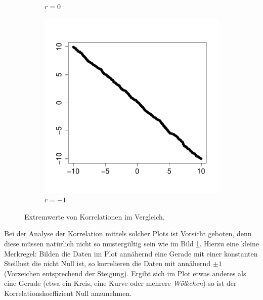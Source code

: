 \begin{figure}[h!]
\begin{subfigure}[b]{0.3\textwidth}
\caption{$r=0$}
\end{subfigure}
\begin{subfigure}[b]{0.3\textwidth}
\includegraphics{begriffe-017}
\caption{$r=-1$}
\end{subfigure}
\caption{Extremwerte von Korrelationen im Vergleich.}
\label{fig:korrelation}
\end{figure}

\noindent
Bei der Analyse der Korrelation mittels solcher Plots ist Vorsicht
geboten, denn diese müssen natürlich nicht so mustergültig sein wie im 
Bild \ref{fig:korrelation}. Hierzu eine kleine Merkregel: Bilden die
Daten im Plot annähernd eine Gerade mit
einer konstanten Steilheit die nicht Null ist, so korrelieren die Daten
mit annähernd $\pm1$ (Vorzeichen entsprechend der Steigung).
Ergibt sich im Plot etwas anderes als eine Gerade (etwa ein Kreis, eine
Kurve oder mehrere \emph{Wölkchen}) so ist der Korrelationskoeffizient
Null anzunehmen.
